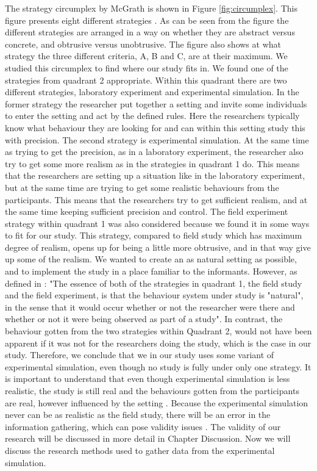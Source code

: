 The strategy circumplex by McGrath is shown in Figure \ref{fig:circumplex}. This figure presents eight different strategies \cite{McGrath}. As can be seen from the figure the different strategies are arranged in a way on whether they are abstract versus concrete, and obtrusive versus unobtrusive. The figure also shows at what strategy the three different criteria, A, B and C, are at their maximum. We studied this circumplex to find where our study fits in. We found one of the strategies from quadrant 2 appropriate. Within this quadrant there are two different strategies, laboratory experiment and experimental simulation. In the former strategy the researcher put together a setting and invite some individuals to enter the setting and act by the defined rules. Here the researchers typically know what behaviour they are looking for and can within this setting study this with precision. The second strategy is experimental simulation. At the same time as trying to get the precision, as in a laboratory experiment, the researcher also try to get some more realism as in the strategies in quadrant 1 do. This means that the researchers are setting up a situation like in the laboratory experiment, but at the same time are trying to get some realistic behaviours from the participants. This means that the researchers try to get sufficient realism, and at the same time keeping sufficient precision and control. The field experiment strategy within quadrant 1 was also considered because we found it in some ways to fit for our study. This strategy, compared to field study which has maximum degree of realism, opens up for being a little more obtrusive, and in that way give up some of the realism. We wanted to create an as natural setting as possible, and to implement the study in a place familiar to the informants. However, as defined in \cite{McGrath}:  "The essence of both of the strategies in quadrant 1, the field study and the field experiment, is that the behaviour system under study is "natural", in the sense that it would occur whether or not the researcher were there and whether or not it were being observed as part of a study". In contrast, the behaviour gotten from the two strategies within Quadrant 2, would not have been apparent if it was not for the researchers doing the study, which is the case in our study. Therefore, we conclude that we in our study uses some variant of experimental simulation, even though no study is fully under only one strategy. It is important to understand that even though experimental simulation is less realistic, the study is still real and the behaviours gotten from the participants are real, however influenced by the setting \cite{McGrath}. Because the experimental simulation never can be as realistic as the field study, there will be an error in the information gathering, which can pose validity issues \cite{alsos}. The validity of our research will be discussed in more detail in Chapter Discussion. Now we will discuss the research methods used to gather data from the experimental simulation. 


